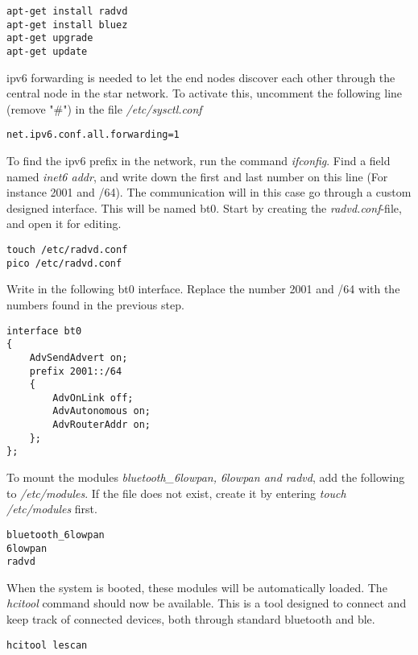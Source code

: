 \begin{verbatim}
apt-get install radvd
apt-get install bluez
apt-get upgrade
apt-get update
\end{verbatim}

\noindent \gls{ipv6} forwarding is needed to let the end nodes discover each other through the central node in the star network. To activate this, uncomment the following line (remove "\#") in the file \textit{/etc/sysctl.conf}

\begin{verbatim}
net.ipv6.conf.all.forwarding=1
\end{verbatim}

\noindent To find the \gls{ipv6} prefix in the network, run the command \textit{ifconfig}. Find a field named \textit{inet6 addr}, and write down the first and last number on this line (For instance 2001 and /64). 
The communication will in this case go through a custom designed interface. This will be named bt0. Start by creating the \textit{radvd.conf}-file, and open it for editing. 

\begin{verbatim}
touch /etc/radvd.conf
pico /etc/radvd.conf
\end{verbatim} 


\noindent Write in the following bt0 interface. Replace the number 2001 and /64 with the numbers found in the previous step. 

\begin{verbatim}
interface bt0
{
    AdvSendAdvert on;
    prefix 2001::/64
    {
        AdvOnLink off;
        AdvAutonomous on;
        AdvRouterAddr on;
    };
};
\end{verbatim} 

\noindent To mount the modules \textit{bluetooth\_6lowpan, 6lowpan and radvd}, add the following to \textit{/etc/modules}. If the file does not exist, create it by entering \textit{touch /etc/modules} first. 

\begin{verbatim}
bluetooth_6lowpan
6lowpan
radvd
\end{verbatim}

\noindent When the system is booted, these modules will be automatically loaded. The \textit{hcitool} command should now be available. This is a tool designed to connect and keep track of connected devices, both through standard bluetooth and \gls{ble}. 

\begin{verbatim}
hcitool lescan
\end{verbatim}

